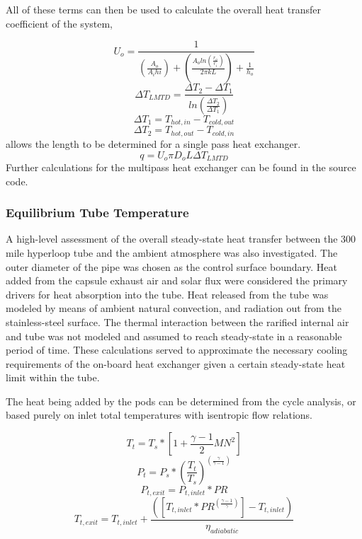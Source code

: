 \documentclass[heading.tex]{subfiles}
\begin{document}
All of these terms can then be used to calculate the overall heat transfer coefficient of the system,

\begin{equation*}
U_{o} = \frac{1} {(\frac{A_{o}}{A_{i}h{i}}) + (\frac{A_{o}ln(\frac{r_{o}}{r_{i}})}{2 \pi k L}) + \frac{1}{h_{o}}}
\end{equation*}
\begin{equation*}
\Delta {T}_{LMTD} = \frac{\Delta {T}_{2}-\Delta {T}_{1}}{ln(\frac{\Delta {T}_{2}}{\Delta {T}_{1}})}
\end{equation*}
\begin{equation*}
\Delta {T}_{1} = T_{hot,in} - T_{cold,out}
\end{equation*}
\begin{equation*}
\Delta {T}_{2} = T_{hot,out} - T_{cold,in}
\end{equation*}
allows the length to be determined for a single pass heat exchanger.
\begin{equation*}
q = U_{o} \pi D_{o} L \Delta {T}_{LMTD}
\end{equation*}
Further calculations for the multipass heat exchanger can be found in the source code.


\subsubsection{Equilibrium Tube Temperature}
A high-level assessment of the overall steady-state heat transfer between the 300 mile hyperloop tube and the ambient atmosphere was also investigated. The outer diameter of the pipe was chosen as the control surface boundary. Heat added from the capsule exhaust air and solar flux were considered the primary drivers for heat absorption into the tube. Heat released from the tube was modeled by means of ambient natural convection, and radiation out from the stainless-steel surface. The thermal interaction between the rarified internal air and tube was not modeled and assumed to reach steady-state in a reasonable period of time. These calculations served to approximate the necessary cooling requirements of the on-board heat exchanger given a certain steady-state heat limit within the tube.

The heat being added by the pods can be determined from the cycle analysis, or based purely on inlet total temperatures with isentropic flow relations.

\begin{equation*}
T_{t} = T_{s} * [1 + \frac{\gamma -1}{2} MN^2]
\end{equation*}
\begin{equation*}
P_{t} = P_{s} * (\frac{ T_{t}}{T_{s}})^(\frac{\gamma}{\gamma -1})
\end{equation*}
\begin{equation*}
P_{t,exit} = P_{t,inlet} * PR
\end{equation*}
\begin{equation*}
T_{t,exit} = T_{t,inlet} + \frac{([T_{t,inlet}*PR^{(\frac{\gamma-1}{\gamma})}] - T_{t,inlet})}  {{\eta}_{adiabatic}}
\end{equation*}
\end{document}
